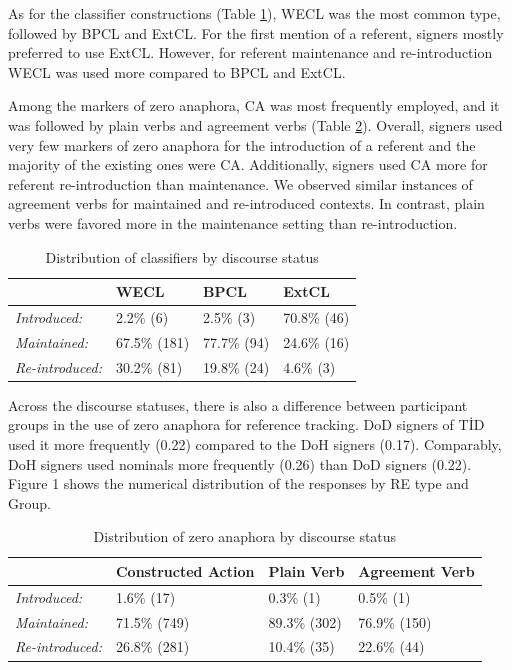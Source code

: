 \documentclass[]{elsarticle} %
\begin{document}
As for the classifier constructions (Table \ref{tab:my-table4}), WECL
was the most common type, followed by BPCL and ExtCL. For the first
mention of a referent, signers mostly preferred to use ExtCL. However,
for referent maintenance and re-introduction WECL was used more compared
to BPCL and ExtCL.

Among the markers of zero anaphora, CA was most frequently employed, and
it was followed by plain verbs and agreement verbs (Table
\ref{tab:my-table5}). Overall, signers used very few markers of zero
anaphora for the introduction of a referent and the majority of the
existing ones were CA. Additionally, signers used CA more for referent
re-introduction than maintenance. We observed similar instances of
agreement verbs for maintained and re-introduced contexts. In contrast,
plain verbs were favored more in the maintenance setting than
re-introduction.

\begin{table}
\small
\caption{Distribution of classifiers by discourse status}
\label{tab:my-table4}
\begin{tabular}{llll}
\hline
                        & WECL          & BPCL        & ExtCL         \\ \hline
\textit{Introduced:}    & 2.2\% (6)    & 2.5\% (3)   & 70.8\% (46) \\
\textit{Maintained:}    & 67.5\% (181) & 77.7\% (94) & 24.6\% (16) \\
\textit{Re-introduced:} & 30.2\% (81)   & 19.8\% (24)   & 4.6\% (3)   \\ \hline
\end{tabular}
\end{table}

Across the discourse statuses, there is also a difference between
participant groups in the use of zero anaphora for reference tracking.
DoD signers of TİD used it more frequently (0.22) compared to the DoH
signers (0.17). Comparably, DoH signers used nominals more frequently
(0.26) than DoD signers (0.22). Figure 1 shows the numerical
distribution of the responses by RE type and Group.

\begin{table}
\small
\caption{Distribution of zero anaphora by discourse status}
\label{tab:my-table5}
\begin{tabular}{llll}
\hline
                        & Constructed Action & Plain Verb    & Agreement Verb \\ \hline
\textit{Introduced:}    & 1.6\% (17)        & 0.3\% (1)    & 0.5\% (1)      \\
\textit{Maintained:}    & 71.5\% (749)      & 89.3\% (302) & 76.9\% (150)  \\
\textit{Re-introduced:} & 26.8\% (281)      & 10.4\% (35)   & 22.6\% (44)   \\ \hline
\end{tabular}
\end{table}
\end{document}
